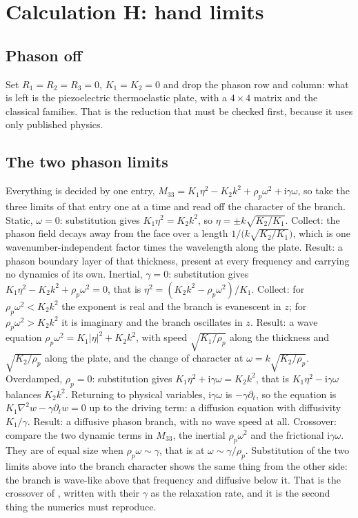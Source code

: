 \documentclass[11pt]{article}
\makeatletter
\newif\ifshowworked
\newenvironment{worked}{%
  \ifshowworked\par\smallskip\noindent\textit{Working.}\par\smallskip\else
  \setbox\z@\vbox\bgroup\fi}{\ifshowworked\par\smallskip\else\egroup\fi}
\newcommand{\ii}{\mathrm{i}}
\makeatother
\begin{document}
\section{Calculation H: hand limits}\label{sec:calcH}

\subsection*{Phason off}

\begin{worked}
Set $R_1=R_2=R_3=0$, $K_1=K_2=0$ and drop the phason row and column: what is left is the piezoelectric
thermoelastic plate, with a $4\times4$ matrix and the classical families. That is the reduction that must be
checked first, because it uses only published physics.
\end{worked}

\subsection*{The two phason limits}

\begin{worked}
Everything is decided by one entry, $M_{33}=K_1\eta^2-K_2k^2+\rho_p\omega^2+\ii\gamma\omega$, so take the
three limits of that entry one at a time and read off the character of the branch.
Static, $\omega=0$: substitution gives $K_1\eta^2=K_2k^2$, so
$\eta=\pm k\sqrt{K_2/K_1}$. Collect: the phason field decays away from the face over a length
$1/\bigl(k\sqrt{K_2/K_1}\bigr)$, which is one wavenumber-independent factor times the wavelength along the
plate. Result: a phason boundary layer of that thickness, present at every frequency and carrying no
dynamics of its own.
Inertial, $\gamma=0$: substitution gives $K_1\eta^2-K_2k^2+\rho_p\omega^2=0$, that is
$\eta^2=(K_2k^2-\rho_p\omega^2)/K_1$. Collect: for $\rho_p\omega^2<K_2k^2$ the exponent is real and the
branch is evanescent in $z$; for $\rho_p\omega^2>K_2k^2$ it is imaginary and the branch oscillates in
$z$. Result: a wave equation
$\rho_p\omega^2=K_1|\eta|^2+K_2k^2$, with speed $\sqrt{K_1/\rho_p}$ along the thickness and
$\sqrt{K_2/\rho_p}$ along the plate, and the change of character at
$\omega=k\sqrt{K_2/\rho_p}$.
Overdamped, $\rho_p=0$: substitution gives $K_1\eta^2+\ii\gamma\omega=K_2k^2$, that is
$K_1\eta^2-\ii\gamma\omega$ balances $K_2k^2$. Returning to physical variables, $\ii\gamma\omega$ is
$-\gamma\partial_t$, so the equation is $K_1\nabla^2w-\gamma\partial_t w=0$ up to the driving term: a
diffusion equation with diffusivity $K_1/\gamma$. Result: a diffusive phason branch, with no wave speed
at all.
Crossover: compare the two dynamic terms in $M_{33}$, the inertial $\rho_p\omega^2$ and the frictional
$\ii\gamma\omega$. They are of equal size when $\rho_p\omega\sim\gamma$, that is at
$\omega\sim\gamma/\rho_p$. Substitution of the two limits above into the branch character shows the same
thing from the other side: the branch is wave-like above that frequency and diffusive below it. That is
the crossover of \cite[Eq.~(17)]{Baggioli2020}, written with their $\gamma$ as the relaxation rate, and it
is the second thing the numerics must reproduce.
\end{worked}
\end{document}
